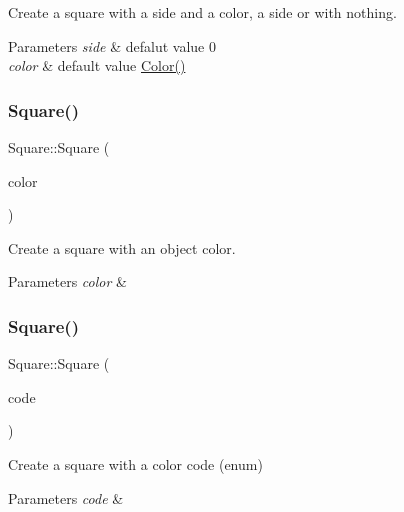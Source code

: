 Create a square with a side and a color, a side or with nothing. 


\begin{DoxyParams}{Parameters}
{\em side} & defalut value 0 \\
\hline
{\em color} & default value \hyperlink{classColor}{Color()} \\
\hline
\end{DoxyParams}
\mbox{\label{classSquare_a5d1815fef1fa705c09f440a4c4564bfc}} 
\subsubsection{\texorpdfstring{Square()}{Square()}\hspace{0.1cm}{\footnotesize\ttfamily [2/3]}}
{\footnotesize\ttfamily Square\+::\+Square (\begin{DoxyParamCaption}\item[{const \hyperlink{classColor}{Color} \&}]{color }\end{DoxyParamCaption})}



Create a square with an object color. 


\begin{DoxyParams}{Parameters}
{\em color} & \\
\hline
\end{DoxyParams}
\mbox{\label{classSquare_ac8b92065c3eeb214430f4c1b6bd80db3}} 
\subsubsection{\texorpdfstring{Square()}{Square()}\hspace{0.1cm}{\footnotesize\ttfamily [3/3]}}
{\footnotesize\ttfamily Square\+::\+Square (\begin{DoxyParamCaption}\item[{\hyperlink{classColor_a20a7b04657c1d83fae5d54514d3f1622}{Color\+::\+Code}}]{code }\end{DoxyParamCaption})}



Create a square with a color code (enum) 


\begin{DoxyParams}{Parameters}
{\em code} & \\
\hline
\end{DoxyParams}


